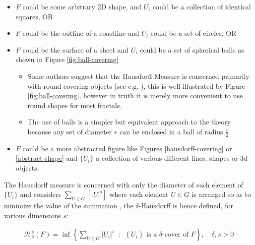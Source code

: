 \documentclass[a4paper,11pt,twoside]{article}
\begin{document}
\begin{itemize}
\item \(F\) could be some arbitrary 2D shape, and \(U_{i}\) could be
a collection of identical squares, OR

\item \(F\) could be the outline of a coastline and \(U_{i}\) could be a set of circles, OR

\item \(F\) could be the surface of a sheet and \(U_{i}\) could be a set of spherical balls as shown in Figure \ref{fig:ball-covering}

\begin{itemize}
\item Some authors suggest that the Hausdorff Measure is concerned primarily with round covering objects (see e.g. \cite{sandersonFractalsAreTypically2017}), this is well illustrated by Figure \ref{fig:ball-covering}, however in truth it is merely more convenient to use round shapes for most fractals.

\item The use of balls is a simpler but equivalent approach to the theory \cite[ ]{falconerFractalGeometryMathematical2003b} because any set of diameter \(r\) can be enclosed in a ball of radius \(\frac{r}{2}\) \cite[p. 166]{edgarMeasureTopologyFractal2008}
\end{itemize}

\item \(F\) could be a more abstracted figure like Figures \ref{hausdorff-covering} or \ref{abstract-shape}  and \(\{U_{i}\}\) a collection of various different lines, shapes or 3d objects.
\end{itemize}

The Hausdorff measure is concerned with only the diameter of each element of \(\{U_{i}\}\) and considers \(\sum_{U \in G} \left[\left\lvert U\right\rvert^{s}\right]\) where each element \(U\in G\) is arranged so as to minimize the value of the summation \cite[p. 27]{falconerFractalGeometryMathematical2003b}
, the \(\delta\)-Hausdorff is hence defined, for various dimensions \(s\):

\begin{align}
\mathcal{H}^s_{\delta}\left( F \right)= \inf \left\{ \sum_{U\in G}   \left\lvert U_i \right\rvert^s \enspace : \enspace  \left\{U_i\right\} \text{ is a } \delta \text{-cover of } F \right\}, \quad \delta, s > 0 \label{eq:delta-measure}
\end{align}
\end{document}
